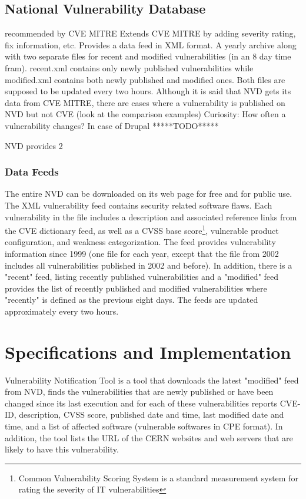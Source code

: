 \subsection{National Vulnerability Database}

	recommended by CVE MITRE
    Extends CVE MITRE by adding severity rating, fix information, etc.
    Provides a data feed in XML format. A yearly archive along with two separate files for recent and modified vulnerabilities (in an 8 day time fram). recent.xml contains only newly published vulnerabilities while modified.xml contains both newly published and modified ones. Both files are supposed to be updated every two hours.
    Although it is said that NVD gets its data from CVE MITRE, there are cases where a vulnerability is published on NVD but not CVE (look at the comparison examples)
    Curiosity: How often a vulnerability changes? In case of Drupal *****TODO***** 
    
NVD provides 2 
\subsubsection{Data Feeds}
The entire NVD can be downloaded on its web page for free and for public use. The XML vulnerability feed contains security related software flaws. Each vulnerability in the file includes a description and associated reference links from the CVE dictionary feed, as well as a CVSS base score\footnote{Common Vulnerability Scoring System is a standard measurement system for rating the severity of IT vulnerabilities}, vulnerable product configuration, and weakness categorization. The feed provides vulnerability information since 1999 (one file for each year, except that the file from 2002 includes all vulnerabilities published in 2002 and before). In addition, there is a "recent" feed, listing recently published vulnerabilities and a "modified" feed provides the list of recently published and modified vulnerabilities where "recently" is defined as the previous eight days. The feeds are updated approximately every two hours.

\section{Specifications and Implementation}
Vulnerability Notification Tool is a tool that downloads the latest "modified" feed from NVD, finds the vulnerabilities that are newly published or have been changed since its last execution and for each of these vulnerabilities reports CVE-ID, description, CVSS score, published date and time, last modified date and time, and a list of affected software (vulnerable softwares in CPE format). In addition, the tool lists the URL of the CERN websites and web servers that are likely to have this vulnerability. 
